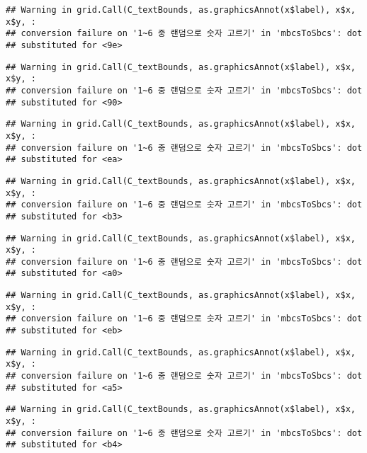 \documentclass[]{book}
\begin{document}
\begin{verbatim}
## Warning in grid.Call(C_textBounds, as.graphicsAnnot(x$label), x$x, x$y, :
## conversion failure on '1~6 중 랜덤으로 숫자 고르기' in 'mbcsToSbcs': dot
## substituted for <9e>
\end{verbatim}

\begin{verbatim}
## Warning in grid.Call(C_textBounds, as.graphicsAnnot(x$label), x$x, x$y, :
## conversion failure on '1~6 중 랜덤으로 숫자 고르기' in 'mbcsToSbcs': dot
## substituted for <90>
\end{verbatim}

\begin{verbatim}
## Warning in grid.Call(C_textBounds, as.graphicsAnnot(x$label), x$x, x$y, :
## conversion failure on '1~6 중 랜덤으로 숫자 고르기' in 'mbcsToSbcs': dot
## substituted for <ea>
\end{verbatim}

\begin{verbatim}
## Warning in grid.Call(C_textBounds, as.graphicsAnnot(x$label), x$x, x$y, :
## conversion failure on '1~6 중 랜덤으로 숫자 고르기' in 'mbcsToSbcs': dot
## substituted for <b3>
\end{verbatim}

\begin{verbatim}
## Warning in grid.Call(C_textBounds, as.graphicsAnnot(x$label), x$x, x$y, :
## conversion failure on '1~6 중 랜덤으로 숫자 고르기' in 'mbcsToSbcs': dot
## substituted for <a0>
\end{verbatim}

\begin{verbatim}
## Warning in grid.Call(C_textBounds, as.graphicsAnnot(x$label), x$x, x$y, :
## conversion failure on '1~6 중 랜덤으로 숫자 고르기' in 'mbcsToSbcs': dot
## substituted for <eb>
\end{verbatim}

\begin{verbatim}
## Warning in grid.Call(C_textBounds, as.graphicsAnnot(x$label), x$x, x$y, :
## conversion failure on '1~6 중 랜덤으로 숫자 고르기' in 'mbcsToSbcs': dot
## substituted for <a5>
\end{verbatim}

\begin{verbatim}
## Warning in grid.Call(C_textBounds, as.graphicsAnnot(x$label), x$x, x$y, :
## conversion failure on '1~6 중 랜덤으로 숫자 고르기' in 'mbcsToSbcs': dot
## substituted for <b4>
\end{verbatim}
\end{document}
